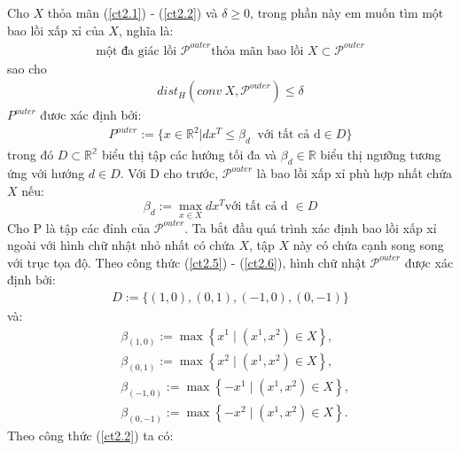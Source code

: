 \documentclass[12pt,a4paper,openany,oneside]{report}
\begin{document}
Cho $X$ thỏa mãn (\ref{ct2.1}) - (\ref{ct2.2}) và $\delta \geq 0$, trong phần này em muốn tìm một bao lồi xấp xỉ của $X$, nghĩa là:
\begin{align}\label{ct2.4}
	\text{một đa giác lồi }\mathcal{P}^{outer} \text{thỏa mãn bao lồi }X\subset\mathcal{P}^{outer}
\end{align}
sao cho
\begin{align}\label{ct2.5}
	dist_H\left(conv\ X, \mathcal{P}^{outer}\right) \leq \delta
\end{align}
$P^{outer}$ đươc xác định bởi:
\begin{align}\label{ct2.6}
	P^{outer} := \{x\in\mathbb{R}^2 | dx^T \leq \beta_d\ \text{ với tất cả d} \in D\}
\end{align}
trong đó $D \subset \mathbb{R^2}$ biểu thị tập các hướng tối đa và $\beta_d \in \mathbb{R}$ biểu thị ngưỡng tương ứng với hướng $d \in D$. Với D cho trước, $\mathcal{P}^{outer}$ là bao lồi xấp xỉ phù hợp nhất chứa $X$ nếu:
\begin{equation}\label{ct2.7}
	\beta_d:=\max _{x \in X} d x^T \text{với tất cả d }\in D
\end{equation}
Cho P là tập các đỉnh của $\mathcal{P}^{outer}$.
Ta bắt đầu quá trình xác định bao lồi xấp xỉ ngoài với hình chữ nhật nhỏ nhất có chứa $X$, tập $X$ này có chứa cạnh song song với trục tọa độ. Theo công thức (\ref{ct2.5}) - (\ref{ct2.6}), hình chữ nhật $\mathcal{P}^{outer}$ được xác định bởi:
\begin{align}\label{ct2.8}
	D:=\{(1, 0), (0, 1), (-1, 0), (0, -1)\}
\end{align}
và:
\begin{equation}
	\begin{aligned}
		& \beta_{(1,0)}:=\max \left\{x^1 \mid\left(x^1, x^2\right) \in X\right\}, \\
		& \beta_{(0,1)}:=\max \left\{x^2 \mid\left(x^1, x^2\right) \in X\right\}, \\
		& \beta_{(-1,0)}:=\max \left\{-x^1 \mid\left(x^1, x^2\right) \in X\right\}, \\
		& \beta_{(0,-1)}:=\max \left\{-x^2 \mid\left(x^1, x^2\right) \in X\right\} .
	\end{aligned}
\end{equation}
Theo công thức (\ref{ct2.2}) ta có:
\end{document}
